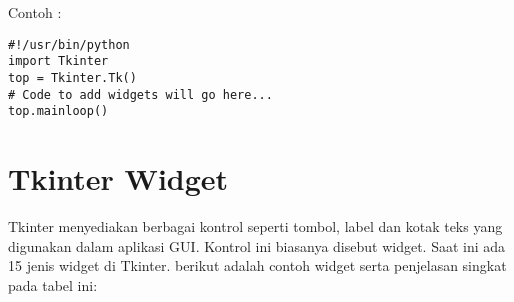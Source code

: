\documentclass [12pt,a4paper,notitlepage,oneside,bahasa]{article}
\begin{document}
\newpage

\vspace{12pt}
\vspace{12pt}
\noindent 
Contoh : 
\begin{verbatim}
#!/usr/bin/python 
import Tkinter 
top = Tkinter.Tk()
# Code to add widgets will go here...
top.mainloop()
\end{verbatim}

\section{\textbf Tkinter Widget} \par
\noindent 
 \hspace*{0.5in} Tkinter menyediakan berbagai kontrol seperti tombol, label dan kotak teks yang digunakan dalam aplikasi GUI. 
 Kontrol ini biasanya disebut widget.
\noindent 
 \hspace*{0.5in} Saat ini ada 15 jenis widget di Tkinter. berikut adalah contoh widget serta penjelasan singkat pada tabel ini:


\end{document}
